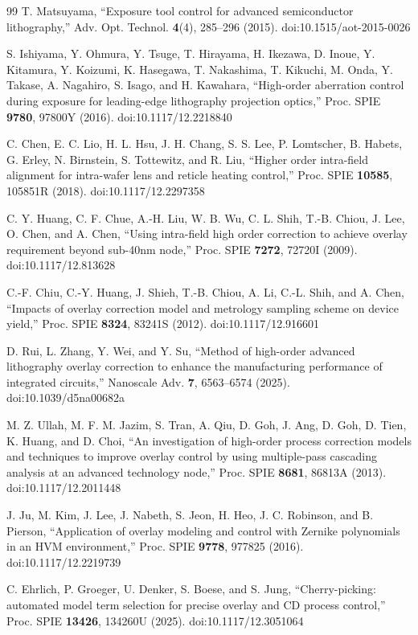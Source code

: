 \documentclass[11pt,a4paper]{ltjsarticle}
\begin{document}
\begin{thebibliography}{99}
T. Matsuyama,
``Exposure tool control for advanced semiconductor lithography,''
Adv. Opt. Technol. \textbf{4}(4), 285--296 (2015). doi:10.1515/aot-2015-0026

S. Ishiyama, Y. Ohmura, Y. Tsuge, T. Hirayama, H. Ikezawa, D. Inoue, Y. Kitamura, Y. Koizumi, K. Hasegawa, T. Nakashima, T. Kikuchi, M. Onda, Y. Takase, A. Nagahiro, S. Isago, and H. Kawahara,
``High-order aberration control during exposure for leading-edge lithography projection optics,''
Proc. SPIE \textbf{9780}, 97800Y (2016). doi:10.1117/12.2218840

C. Chen, E. C. Lio, H. L. Hsu, J. H. Chang, S. S. Lee, P. Lomtscher, B. Habets, G. Erley, N. Birnstein, S. Tottewitz, and R. Liu,
``Higher order intra-field alignment for intra-wafer lens and reticle heating control,''
Proc. SPIE \textbf{10585}, 105851R (2018). doi:10.1117/12.2297358

C. Y. Huang, C. F. Chue, A.-H. Liu, W. B. Wu, C. L. Shih, T.-B. Chiou, J. Lee, O. Chen, and A. Chen,
``Using intra-field high order correction to achieve overlay requirement beyond sub-40nm node,''
Proc. SPIE \textbf{7272}, 72720I (2009). doi:10.1117/12.813628

C.-F. Chiu, C.-Y. Huang, J. Shieh, T.-B. Chiou, A. Li, C.-L. Shih, and A. Chen,
``Impacts of overlay correction model and metrology sampling scheme on device yield,''
Proc. SPIE \textbf{8324}, 83241S (2012). doi:10.1117/12.916601

D. Rui, L. Zhang, Y. Wei, and Y. Su,
``Method of high-order advanced lithography overlay correction to enhance the manufacturing performance of integrated circuits,''
Nanoscale Adv. \textbf{7}, 6563--6574 (2025). doi:10.1039/d5na00682a

M. Z. Ullah, M. F. M. Jazim, S. Tran, A. Qiu, D. Goh, J. Ang, D. Goh, D. Tien, K. Huang, and D. Choi,
``An investigation of high-order process correction models and techniques to improve overlay control by using multiple-pass cascading analysis at an advanced technology node,''
Proc. SPIE \textbf{8681}, 86813A (2013). doi:10.1117/12.2011448

J. Ju, M. Kim, J. Lee, J. Nabeth, S. Jeon, H. Heo, J. C. Robinson, and B. Pierson,
``Application of overlay modeling and control with Zernike polynomials in an HVM environment,''
Proc. SPIE \textbf{9778}, 977825 (2016). doi:10.1117/12.2219739

C. Ehrlich, P. Groeger, U. Denker, S. Boese, and S. Jung,
``Cherry-picking: automated model term selection for precise overlay and CD process control,''
Proc. SPIE \textbf{13426}, 134260U (2025). doi:10.1117/12.3051064


\end{thebibliography}
\end{document}

